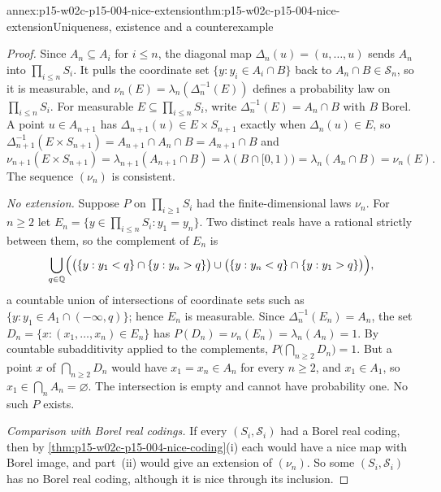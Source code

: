 \begin{annexitem}{annex:p15-w02c-p15-004-nice-extension}{thm:p15-w02c-p15-004-nice-extension}{Uniqueness, existence and a counterexample}
\begin{proof}
Since \(A_n\subseteq A_i\) for \(i\leq n\), the diagonal map
\(\Delta_n(u)=(u,\ldots,u)\) sends \(A_n\) into \(\prod_{i\leq n}S_i\). It
pulls the coordinate set \(\{y:y_i\in A_i\cap B\}\) back to
\(A_n\cap B\in\mathcal S_n\), so it is measurable, and
\(\nu_n(E)=\lambda_n(\Delta_n^{-1}(E))\) defines a probability law on
\(\prod_{i\leq n}S_i\). For measurable \(E\subseteq\prod_{i\leq n}S_i\),
write \(\Delta_n^{-1}(E)=A_n\cap B\) with \(B\) Borel. A point
\(u\in A_{n+1}\) has \(\Delta_{n+1}(u)\in E\times S_{n+1}\) exactly when
\(\Delta_n(u)\in E\), so
\(\Delta_{n+1}^{-1}(E\times S_{n+1})=A_{n+1}\cap A_n\cap B=A_{n+1}\cap B\) and
\[
 \nu_{n+1}(E\times S_{n+1})=\lambda_{n+1}(A_{n+1}\cap B)
   =\lambda(B\cap[0,1))=\lambda_n(A_n\cap B)=\nu_n(E).
\]
The sequence \((\nu_n)\) is consistent.

\emph{No extension.} Suppose \(P\) on \(\prod_{i\geq1}S_i\) had the
finite-dimensional laws \(\nu_n\). For \(n\geq2\) let
\(E_n=\{y\in\prod_{i\leq n}S_i:y_1=y_n\}\). Two distinct reals have a
rational strictly between them, so the complement of \(E_n\) is
\[
 \bigcup_{q\in\mathbb Q}\Bigl(\bigl(\{y:y_1<q\}\cap\{y:y_n>q\}\bigr)\cup
 \bigl(\{y:y_n<q\}\cap\{y:y_1>q\}\bigr)\Bigr),
\]
a countable union of intersections of coordinate sets such as
\(\{y:y_1\in A_1\cap(-\infty,q)\}\); hence \(E_n\) is measurable. Since
\(\Delta_n^{-1}(E_n)=A_n\), the set \(D_n=\{x:(x_1,\ldots,x_n)\in E_n\}\)
has \(P(D_n)=\nu_n(E_n)=\lambda_n(A_n)=1\). By countable subadditivity
applied to the complements, \(P\bigl(\bigcap_{n\geq2}D_n\bigr)=1\). But a
point \(x\) of \(\bigcap_{n\geq2}D_n\) would have \(x_1=x_n\in A_n\) for
every \(n\geq2\), and \(x_1\in A_1\), so \(x_1\in\bigcap_nA_n=\varnothing\).
The intersection is empty and cannot have probability one. No such \(P\)
exists.

\emph{Comparison with Borel real codings.} If every \((S_i,\mathcal S_i)\)
had a Borel real coding, then by
\cref{thm:p15-w02c-p15-004-nice-coding}(i) each would have a nice map with
Borel image, and part~(ii) would give an extension of \((\nu_n)\). So some
\((S_i,\mathcal S_i)\) has no Borel real coding, although it is nice
through its inclusion.
\end{proof}
\end{annexitem}

